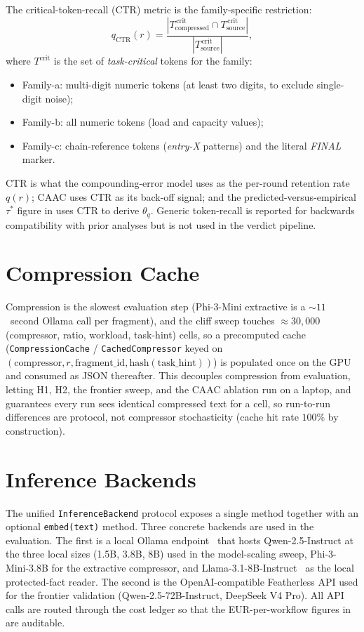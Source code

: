 The critical-token-recall (CTR) metric is the family-specific
restriction:
\[
  q_\text{CTR}(r) = \frac{|T_\text{compressed}^{\,\text{crit}} \cap
                          T_\text{source}^{\,\text{crit}}|}
                         {|T_\text{source}^{\,\text{crit}}|},
\]
where $T^\text{crit}$ is the set of \emph{task-critical} tokens for
the family:
\begin{itemize}\setlength\itemsep{1pt}
\item Family-a: multi-digit numeric tokens (at least two digits, to
exclude single-digit noise);
\item Family-b: all numeric tokens (load and capacity values);
\item Family-c: chain-reference tokens (\emph{entry-X} patterns) and
the literal \emph{FINAL} marker.
\end{itemize}

CTR is what the compounding-error model uses as the per-round
retention rate $q(r)$; CAAC uses CTR as its back-off signal; and
the predicted-versus-empirical $\tau^{*}$ figure in
 uses CTR to derive $\theta_q$. Generic
token-recall is reported for backwards compatibility with prior
analyses but is not used in the verdict pipeline.

\section{Compression Cache}
\label{sec:cache}

Compression is the slowest evaluation step (Phi-3-Mini extractive
is a $\sim11$~second Ollama call per fragment), and the cliff sweep
touches $\approx30{,}000$ (compressor, ratio, workload, task-hint)
cells, so a precomputed cache (\texttt{CompressionCache} /
\texttt{CachedCompressor}
keyed on $(\text{compressor}, r, \text{fragment\_id}, \text{hash}(\text{task\_hint}))$)
is populated once on the GPU and consumed as JSON thereafter. This
decouples compression from evaluation, letting H1, H2, the frontier
sweep, and the CAAC ablation run on a laptop, and guarantees every
run sees identical compressed text for a cell, so run-to-run
differences are protocol, not compressor stochasticity (cache hit
rate $100\%$ by construction).

\section{Inference Backends}
\label{sec:inference}

The unified \texttt{InferenceBackend} protocol exposes a single
 method
together with an optional \texttt{embed(text)} method. Three concrete
backends are used in the evaluation. The first is a local Ollama
endpoint~\cite{ollama} that hosts Qwen-2.5-Instruct at the three
local sizes (\textsc{1.5B}, \textsc{3.8B}, \textsc{8B}) used in
the model-scaling sweep, Phi-3-Mini-3.8B for the extractive
compressor, and Llama-3.1-8B-Instruct~\cite{llama31modelcard} as the
local protected-fact reader. The second is the OpenAI-compatible Featherless API used
for the frontier validation (Qwen-2.5-72B-Instruct, DeepSeek V4
Pro). All API calls are routed through the cost ledger so
that the EUR-per-workflow figures in
 are auditable.


